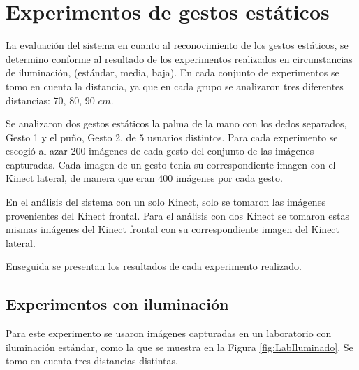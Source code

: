 

\section{Experimentos de gestos estáticos}\label{TestStaticGestures}  

La evaluación del sistema en cuanto al reconocimiento de los gestos estáticos, se determino conforme al resultado de los experimentos realizados en circunstancias de iluminación, (estándar, media, baja). En cada conjunto de experimentos se tomo en cuenta la distancia, ya que en cada grupo se analizaron tres diferentes distancias: $70$, $80$, $90$ $cm$.  

Se analizaron dos gestos estáticos la palma de la mano con los dedos separados, Gesto 1 y el puño, Gesto 2, de $5$ usuarios distintos. Para cada experimento se escogió al azar $200$ imágenes de cada gesto del conjunto de las imágenes capturadas. Cada imagen de un gesto tenia su correspondiente imagen con el Kinect lateral, de manera que eran $400$ imágenes por cada gesto. 

En el análisis del sistema con un solo Kinect, solo se tomaron las imágenes provenientes del Kinect frontal. Para el análisis con dos Kinect se tomaron estas mismas imágenes del Kinect frontal con su correspondiente imagen del Kinect lateral.

Enseguida se presentan los resultados de cada experimento realizado.


\subsection{Experimentos con iluminación} 
Para este experimento se usaron imágenes capturadas en un laboratorio con iluminación estándar, como la que se muestra en la Figura \ref{fig:LabIluminado}. Se tomo en cuenta tres distancias distintas. 

